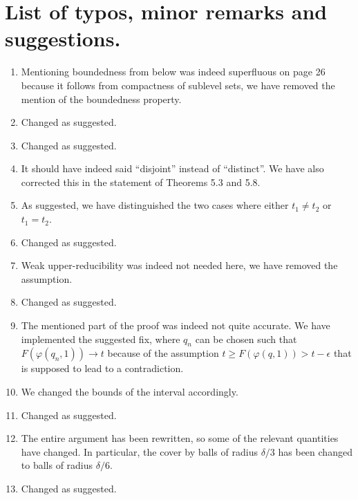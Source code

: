 \documentclass{article}
\begin{document}
	\section{List of typos, minor remarks and suggestions.}
	\begin{enumerate}
		\item Mentioning boundedness from below was indeed superfluous on page 26 because it follows from compactness of sublevel sets, we have removed the mention of the boundedness property.
		\item Changed as suggested.
		\item Changed as suggested.
		\item It should have indeed said ``disjoint'' instead of ``distinct''. We have also corrected this in the statement of Theorems 5.3 and 5.8.
		\item As suggested, we have distinguished the two cases where either $t_{1} \neq t_{2}$ or $t_{1} = t_{2}$.
		\item Changed as suggested.
		\item Weak upper-reducibility was indeed not needed here, we have removed the assumption.
		\item Changed as suggested.
		\item The mentioned part of the proof was indeed not quite accurate. We have implemented the suggested fix, where $q_{n}$ can be chosen such that $F(\varphi(q_{n},1)) \to t$ because of the assumption $t \geq F(\varphi(q,1)) > t - \epsilon$ that is supposed to lead to a contradiction.
		\item We changed the bounds of the interval accordingly.
		\item Changed as suggested.
		\item The entire argument has been rewritten, so some of the relevant quantities have changed. In particular, the cover by balls of radius $\delta/3$ has been changed to balls of radius $\delta/6$.
		\item Changed as suggested.
	\end{enumerate}
\end{document}

